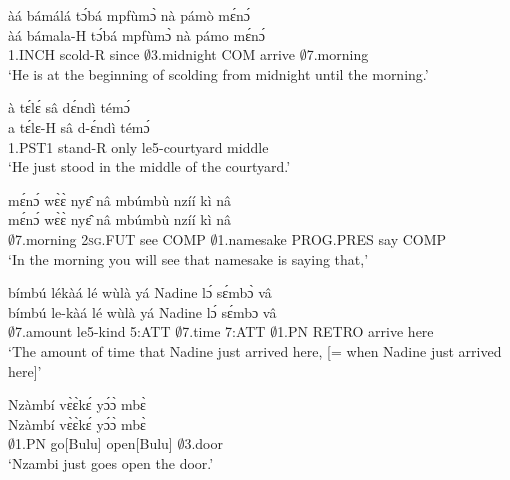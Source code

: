 \begin{exe} 
\exN\label{199}
  \glll àá bámálá tɔ́bá mpfùmɔ̀ nà pámò mɛ́nɔ́ \\
       àá bámala-H tɔ́bá mpfùmɔ̀ nà pámo mɛ́nɔ́ \\
       1.INCH scold-R since  $\emptyset$3.midnight COM arrive $\emptyset$7.morning \\
    \trans `He is at the beginning of scolding from midnight until the morning.'
\end{exe}

\begin{exe} 
\exN\label{200} 
  \glll à tɛ́lɛ́ sâ dɛ́ndì témɔ́ \\
         a tɛ́lɛ-H sâ d-ɛ́ndì témɔ́ \\
        1.PST1 stand-R only le5-courtyard middle \\
    \trans `He just stood in the middle of the courtyard.'
\end{exe}

\begin{exe} 
\exN\label{201}
  \glll mɛ́nɔ́ wɛ̀ɛ̀ nyɛ̂ nâ mbúmbù nzíí kì nâ \\
        mɛ́nɔ́ wɛ̀ɛ̀ nyɛ̂ nâ mbúmbù nzíí kì nâ \\
       $\emptyset$7.morning 2\textsc{sg}.FUT see COMP $\emptyset$1.namesake PROG.PRES say COMP  \\
    \trans `In the morning you will see that namesake is saying that,'
\end{exe}

\begin{exe} 
\exN\label{202}
  \glll bímbú lékàá lé wùlà yá Nadine lɔ́ sɛ́mbɔ̀ vâ \\
         bímbú le-kàá lé wùlà yá Nadine lɔ́ sɛ́mbɔ vâ \\
        $\emptyset$7.amount le5-kind 5:ATT $\emptyset$7.time 7:ATT $\emptyset$1.PN RETRO arrive here \\
    \trans `The amount of time that Nadine just arrived here, [= when Nadine just arrived here]'
\end{exe}

\begin{exe} 
\exN\label{203}
  \glll  Nzàmbí vɛ̀ɛ̀kɛ́ yɔ́ɔ̀ mbɛ̀ \\
        Nzàmbí vɛ̀ɛ̀kɛ́ yɔ́ɔ̀ mbɛ̀ \\
        $\emptyset$1.PN go[Bulu] open[Bulu] $\emptyset$3.door  \\
    \trans `Nzambi just goes open the door.'
\end{exe}

